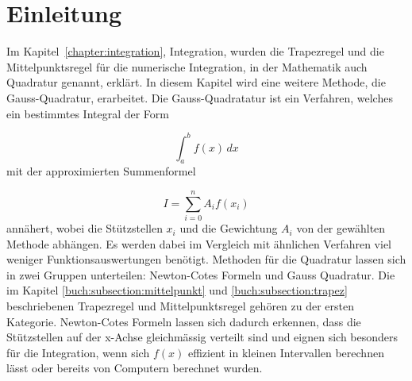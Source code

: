 %
%
%
\section{Einleitung\label{quadratur:section:einleitung}}

Im Kapitel~\ref{chapter:integration}, Integration, wurden die 
Trapezregel und die Mittelpunktsregel für die numerische Integration, 
in der Mathematik auch Quadratur genannt, erklärt. 
In diesem Kapitel wird eine weitere Methode, die Gauss-Quadratur, erarbeitet.
\noindent
Die Gauss-Quadratatur ist ein Verfahren, welches ein bestimmtes Integral der Form

\begin{equation}
    \int_{a}^{b} f(x) \,dx
\end{equation}
\noindent
mit der approximierten Summenformel 

\begin{equation}
    I = \sum_{i=0}^{n} A_i f(x_i)
\end{equation}
\noindent
annähert, wobei die Stützstellen $x_i$ und die Gewichtung $A_i$ von der gewählten 
Methode abhängen. 
Es werden dabei im Vergleich mit ähnlichen Verfahren viel weniger Funktionsauswertungen benötigt.
\noindent
Methoden für die Quadratur lassen sich in zwei Gruppen unterteilen: 
Newton-Cotes Formeln und Gauss Quadratur.
Die im Kapitel \ref{buch:subsection:mittelpunkt} und \ref{buch:subsection:trapez} beschriebenen
Trapezregel und Mittelpunktsregel gehören zu der ersten Kategorie.
Newton-Cotes Formeln lassen sich dadurch erkennen, dass die Stützstellen auf der x-Achse 
gleichmässig verteilt sind und eignen sich besonders für die Integration, wenn sich $f(x)$ 
effizient in kleinen Intervallen berechnen lässt oder bereits von Computern berechnet wurden.

\newpage





